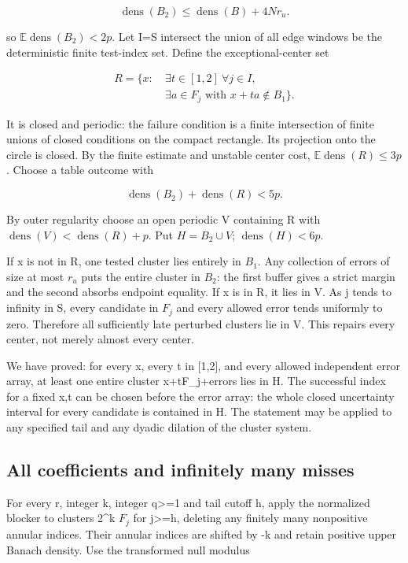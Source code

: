 \documentclass[
  11pt,
]{article}
\theoremstyle{remark}\newtheorem{remark}[theorem]{Remark}
\begin{document}
\[
\operatorname{dens}(B_2)\le\operatorname{dens}(B)+4Nr_u.
\]

so \(\mathbb E\operatorname{dens}(B_2)<2p\). Let I=S intersect the union
of all edge windows be the deterministic finite test-index set. Define
the exceptional-center set

\[
\begin{split}R=\{x:\ &\exists t\in[1,2]\ \forall j\in I,\\ &\exists a\in F_j\text{ with }x+ta\notin B_1\}.\end{split}
\]

It is closed and periodic: the failure condition is a finite
intersection of finite unions of closed conditions on the compact
rectangle. Its projection onto the circle is closed. By the finite
estimate and unstable center cost,
\(\mathbb E\operatorname{dens}(R)\le3p\). Choose a table outcome with

\[
\operatorname{dens}(B_2)+\operatorname{dens}(R)<5p.
\]

By outer regularity choose an open periodic V containing R with
\(\operatorname{dens}(V)<\operatorname{dens}(R)+p\). Put
\(H=B_2\cup V\); \(\operatorname{dens}(H)<6p\).

If x is not in R, one tested cluster lies entirely in \(B_1\). Any
collection of errors of size at most \(r_u\) puts the entire cluster in
\(B_2\): the first buffer gives a strict margin and the second absorbs
endpoint equality. If x is in R, it lies in V. As j tends to infinity in
S, every candidate in \(F_j\) and every allowed error tends uniformly to
zero. Therefore all sufficiently late perturbed clusters lie in V. This
repairs every center, not merely almost every center.

We have proved: for every x, every t in {[}1,2{]}, and every allowed
independent error array, at least one entire cluster x+tF\_j+errors lies
in H. The successful index for a fixed x,t can be chosen before the
error array: the whole closed uncertainty interval for every candidate
is contained in H. The statement may be applied to any specified tail
and any dyadic dilation of the cluster system.

\subsection{All coefficients and infinitely many
misses}\label{all-coefficients-and-infinitely-many-misses}

For every r, integer k, integer q\textgreater=1 and tail cutoff h, apply
the normalized blocker to clusters 2\^{}k \(F_j\) for j\textgreater=h,
deleting any finitely many nonpositive annular indices. Their annular
indices are shifted by -k and retain positive upper Banach density. Use
the transformed null modulus
\end{document}
